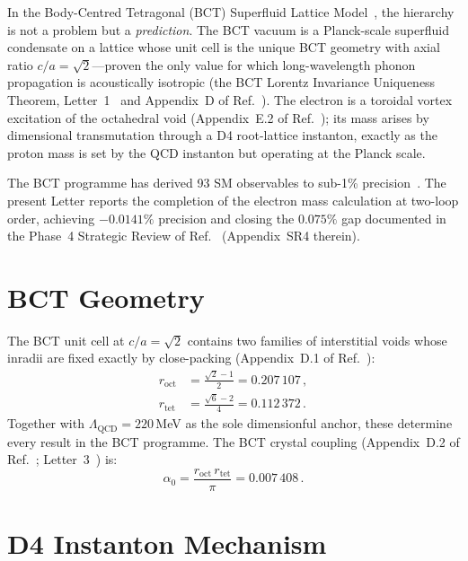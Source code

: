 \documentclass[twocolumn,10pt,a4paper]{article}
\begin{document}
In the Body-Centred Tetragonal (BCT) Superfluid Lattice
Model~\cite{prl,monograph}, the hierarchy is not a problem but a
\textit{prediction}. The BCT vacuum is a Planck-scale superfluid condensate
on a lattice whose unit cell is the unique BCT geometry with axial ratio
$c/a=\sqrt{2}$---proven the only value for which long-wavelength phonon
propagation is acoustically isotropic (the BCT Lorentz Invariance Uniqueness
Theorem, Letter~1~\cite{lorentz} and Appendix~D of
Ref.~\cite{monograph}). The electron is a toroidal vortex excitation of the
octahedral void (Appendix~E.2 of Ref.~\cite{monograph}); its mass arises by
dimensional transmutation through a D4 root-lattice instanton, exactly as the
proton mass is set by the QCD instanton but operating at the Planck scale.

The BCT programme has derived 93 SM observables to sub-1\%
precision~\cite{prl,monograph}. The present Letter reports the completion of
the electron mass calculation at two-loop order, achieving $-0.0141\%$
precision and closing the $0.075\%$ gap documented in the Phase~4
Strategic Review of Ref.~\cite{monograph} (Appendix~SR4 therein).

\section*{BCT Geometry}

The BCT unit cell at $c/a=\sqrt{2}$ contains two families of interstitial
voids whose inradii are fixed exactly by close-packing
(Appendix~D.1 of Ref.~\cite{monograph}):
\begin{align}
  r_\mathrm{oct} &= \tfrac{\sqrt{2}-1}{2} = 0.207\,107\,, \label{eq:roct}\\
  r_\mathrm{tet} &= \tfrac{\sqrt{6}-2}{4}  = 0.112\,372\,. \label{eq:rtet}
\end{align}
Together with $\Lambda_\mathrm{QCD}=220$\,MeV as the sole dimensionful
anchor, these determine every result in the BCT programme. The BCT crystal
coupling (Appendix~D.2 of Ref.~\cite{monograph}; Letter~3~\cite{finestructure})
is:
\begin{equation}
  \alpha_0 = \frac{r_\mathrm{oct}\,r_\mathrm{tet}}{\pi} = 0.007\,408\,.
  \label{eq:alpha0}
\end{equation}

\section*{D4 Instanton Mechanism}
\end{document}
